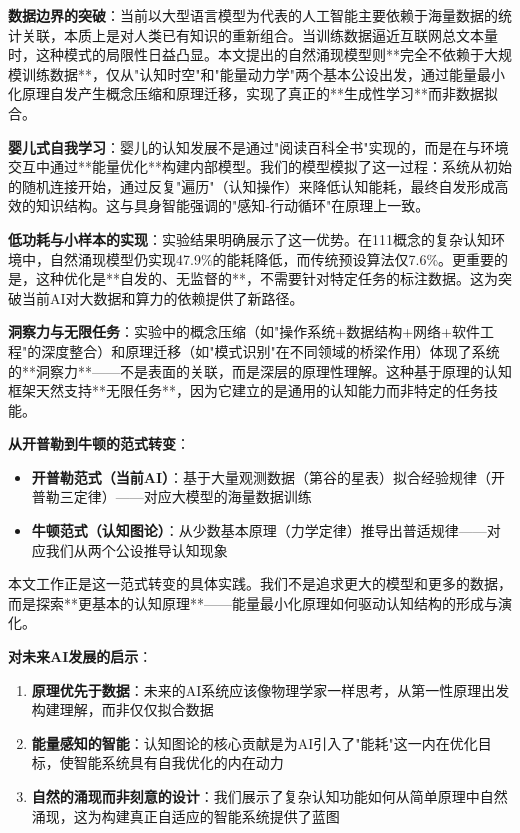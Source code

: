 \documentclass[12pt,a4paper]{article}
\begin{document}
\textbf{数据边界的突破}：当前以大型语言模型为代表的人工智能主要依赖于海量数据的统计关联，本质上是对人类已有知识的重新组合。当训练数据逼近互联网总文本量时，这种模式的局限性日益凸显。本文提出的自然涌现模型则**完全不依赖于大规模训练数据**，仅从"认知时空"和"能量动力学"两个基本公设出发，通过能量最小化原理自发产生概念压缩和原理迁移，实现了真正的**生成性学习**而非数据拟合。

\textbf{婴儿式自我学习}：婴儿的认知发展不是通过"阅读百科全书"实现的，而是在与环境交互中通过**能量优化**构建内部模型。我们的模型模拟了这一过程：系统从初始的随机连接开始，通过反复"遍历"（认知操作）来降低认知能耗，最终自发形成高效的知识结构。这与具身智能强调的"感知-行动循环"在原理上一致。

\textbf{低功耗与小样本的实现}：实验结果明确展示了这一优势。在111概念的复杂认知环境中，自然涌现模型仍实现47.9\%的能耗降低，而传统预设算法仅7.6\%。更重要的是，这种优化是**自发的、无监督的**，不需要针对特定任务的标注数据。这为突破当前AI对大数据和算力的依赖提供了新路径。

\textbf{洞察力与无限任务}：实验中的概念压缩（如"操作系统+数据结构+网络+软件工程"的深度整合）和原理迁移（如"模式识别"在不同领域的桥梁作用）体现了系统的**洞察力**——不是表面的关联，而是深层的原理性理解。这种基于原理的认知框架天然支持**无限任务**，因为它建立的是通用的认知能力而非特定的任务技能。

\textbf{从开普勒到牛顿的范式转变}：
\begin{itemize}
\item \textbf{开普勒范式（当前AI）}：基于大量观测数据（第谷的星表）拟合经验规律（开普勒三定律）——对应大模型的海量数据训练
\item \textbf{牛顿范式（认知图论）}：从少数基本原理（力学定律）推导出普适规律——对应我们从两个公设推导认知现象
\end{itemize}

本文工作正是这一范式转变的具体实践。我们不是追求更大的模型和更多的数据，而是探索**更基本的认知原理**——能量最小化原理如何驱动认知结构的形成与演化。

\textbf{对未来AI发展的启示}：
\begin{enumerate}
\item \textbf{原理优先于数据}：未来的AI系统应该像物理学家一样思考，从第一性原理出发构建理解，而非仅仅拟合数据
\item \textbf{能量感知的智能}：认知图论的核心贡献是为AI引入了"能耗"这一内在优化目标，使智能系统具有自我优化的内在动力
\item \textbf{自然的涌现而非刻意的设计}：我们展示了复杂认知功能如何从简单原理中自然涌现，这为构建真正自适应的智能系统提供了蓝图
\end{enumerate}
\end{document}
